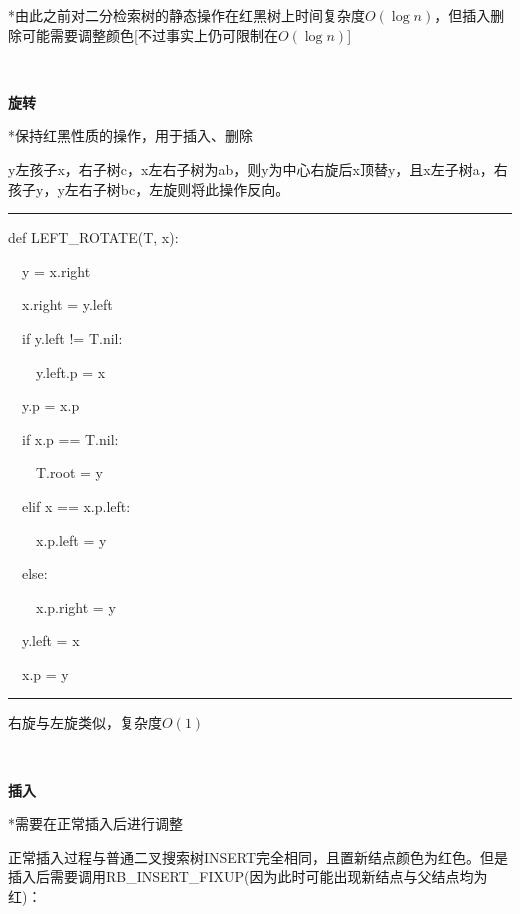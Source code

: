 \documentclass[a4paper,UTF8,fontset=windows]{ctexart}
\newenvironment{code}{\rule{36em}{0.1em}\setlength{\parindent}{1em}

}{

\setlength{\parindent}{0em}\rule{36em}{0.1em}}
\begin{document}
*\hspace{0em}由此之前对二分检索树的静态操作在红黑树上时间复杂度$O(\log n)$，但插入删除可能需要调整颜色[不过事实上仍可限制在$O(\log n)$]

\

\textbf{旋转}

*\hspace{0em}保持红黑性质的操作，用于插入、删除

y左孩子x，右子树c，x左右子树为ab，则y为中心右旋后x顶替y，且x左子树a，右孩子y，y左右子树bc，左旋则将此操作反向。

\begin{code}
def LEFT\_ROTATE(T, x):

\ \ y = x.right

\ \ x.right = y.left

\ \ if y.left != T.nil:

\ \ \ \ y.left.p = x

\ \ y.p = x.p

\ \ if x.p == T.nil:

\ \ \ \ T.root = y

\ \ elif x == x.p.left:

\ \ \ \ x.p.left = y

\ \ else:

\ \ \ \ x.p.right = y

\ \ y.left = x

\ \ x.p = y
\end{code}

右旋与左旋类似，复杂度$O(1)$

\

\textbf{插入}

*\hspace{0em}需要在正常插入后进行调整

正常插入过程与普通二叉搜索树INSERT完全相同，且置新结点颜色为红色。但是插入后需要调用RB\_INSERT\_FIXUP(因为此时可能出现新结点与父结点均为红)：
\end{document}
